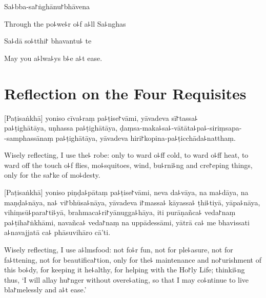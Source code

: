 Sa꜕bba-sa꜓ṅghānu꜓bhāvena

\begin{english}
  Through the po꜕we꜕r o꜕f a꜕ll Sa꜕nghas
\end{english}

Sa꜕dā so꜕tthi꜓ bhavantu꜕ te

\begin{english}
  May you a꜕lwa꜕ys b꜕e a꜕t ease.
\end{english}

\clearpage

\chapter[Four Requisites]{Reflection on the Four Requisites}%


\begin{leader}
\end{leader}


[Paṭisaṅkhā] yoniso cīva꜕raṃ pa꜕ṭise꜓vāmi, yāvadeva sī꜓tassa꜕\\
pa꜕ṭighātāya, uṇhassa pa꜕ṭighātāya, ḍaṃsa-maka꜕sa꜕-vātāta꜕pa꜕-siriṃsapa-\\
-samphassānaṃ pa꜕ṭighātāya, yāvadeva hiri꜓kopina-pa꜕ṭicchāda꜕natthaṃ.

\begin{english}
  Wisely reflecting, I use the꜕ robe: only to ward o꜕ff cold, to ward o꜕ff heat, to ward off the touch o꜕f flies, mo꜕squitoes, wind, bu꜕rni꜕ng and cre꜓eping things, only for the sa꜓ke of mo꜕desty.
\end{english}

[Paṭisaṅkhā] yoniso piṇḍa꜕pātaṃ pa꜕ṭise꜓vāmi, neva da꜕vāya, na ma꜕dāya, na maṇḍa꜕nāya, na꜕ vi꜓bhūsa꜕nāya, yāvadeva i꜓massa꜕ kāyassa꜕ ṭhi꜕tiyā, yāpa꜕nāya, vihiṃsū꜕para꜓ti꜕yā, brahmaca꜕ri꜓yānugga꜕hāya, iti purāṇañca꜕ veda꜓naṃ pa꜕ṭiha꜓ṅkhāmi, navañca꜕ veda꜓naṃ na uppādessāmi, yātrā ca꜕ me bhavissati a꜕navajjatā ca꜕ phāsuvihāro cā'ti.

\begin{english}
  Wisely reflecting, I use a꜕lmsfood: not fo꜕r fun, not for ple꜕asure, not for fa꜕ttening, not for beautifica꜓tion, only for the꜕ maintenance and no꜓urishment of this bo꜕dy, for keeping it he꜕althy, for helping with the Ho꜓ly Life; thinki꜕ng thus, `I will allay hu꜓nger without overe꜕ating, so that I may co꜕ntinue to live bla꜓melessly and a꜕t ease.'
\end{english}

